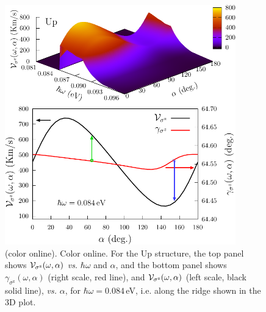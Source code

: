 \documentclass[floatfix,prb,aps,superscriptaddress,showpacs,11pt,preprint,letterpaper]{revtex4}
\def\tama{10cm}
\begin{document}
\begin{figure}[t]
\centering
\includegraphics[width=\tama]{figures/fig4}
\caption{(color online). Color online. For the Up structure, the top panel
shows ${\cal V}_{\sigma^\mathrm{z}}(\omega,\alpha)$ {\it vs.} $\hbar\omega$ and
$\alpha$, and the bottom panel shows
$\gamma_{\sigma^\mathrm{z}}(\omega,\alpha)$ (right scale, red line), and ${\cal
V}_{\sigma^\mathrm{z}}(\omega,\alpha)$ (left scale, black solid line), {\it
vs.} $\alpha$, for $\hbar\omega=0.084$\,eV, i.e. along the ridge shown in the
3D plot. }
\label{fig:up-vsz-w1}
\end{figure}
\end{document}
